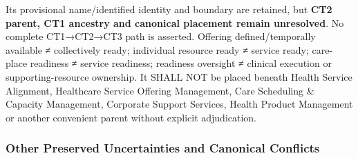 \label{rad:business:1201}

Its provisional name/\allowbreak{}identified identity and boundary are retained, but \textbf{CT2 parent, CT1 ancestry and canonical placement remain unresolved}. No complete CT1→CT2→CT3 path is asserted. Offering defined/\allowbreak{}temporally available ≠ collectively ready; individual resource ready ≠ service ready; care-place readiness ≠ service readiness; readiness oversight ≠ clinical execution or supporting-resource ownership. It SHALL NOT be placed beneath Health Service Alignment, Healthcare Service Offering Management, Care Scheduling \& Capacity Management, Corporate Support Services, Health Product Management or another convenient parent without explicit adjudication.

\label{rad:business:1211}
\subsubsection*{Other Preserved Uncertainties and Canonical Conflicts}
\label{rad:business:1213}

